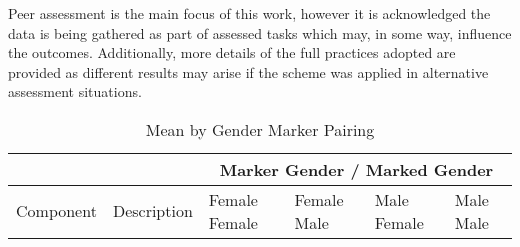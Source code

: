 \documentclass[sigconf, anonymous=true]{acmart}
\begin{document}
Peer assessment is the main focus of this work, however it is acknowledged the data is being gathered as part of assessed tasks which may, in some way, influence the outcomes. Additionally, more details of the full practices adopted are provided as different results may arise if the scheme was applied in alternative assessment situations.
\begin{table*}[ht]
	\caption{Mean by Gender Marker Pairing}
	\begin{tabular} {| p{3cm} | p{8cm} | p{1cm}| p{1cm} | p{1cm}| p{1cm} |} 
		\hline
		
		& & \multicolumn{4}{c}{Marker Gender  / Marked Gender } \\
		\hline
		
		
		
		Component & Description & Female Female & Female Male
		& Male Female & Male Male \\
		\hline
		

\end{tabular}
\end{table*}
\end{document}
